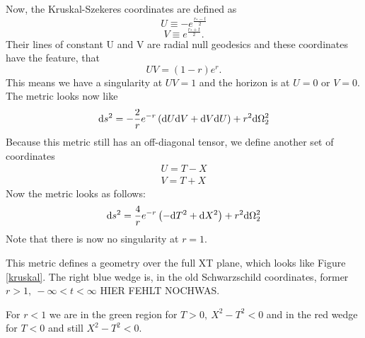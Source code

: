 		Now, the Kruskal-Szekeres coordinates are defined as
		\begin{equation}
			U\equiv -e^{\frac{r_*-t}{2}}
		\end{equation}
		\begin{equation}
			V\equiv e^{\frac{r_*+t}{2}}.
		\end{equation}
	Their lines of constant U and V are radial null geodesics and these coordinates have the feature, that
		\begin{equation}
			 UV=(1-r)e^r.
		\end{equation}
	This means we have a singularity at $UV=1$ and the horizon is at $U=0$ or $V=0$. The metric looks now like
		\begin{equation}
			\mathrm{d} s^2=-\frac{2}{r}e^{-r}\left(\mathrm{d} U \mathrm{d} V + \mathrm{d} V \mathrm{d} U\right)+r^2 \mathrm{d} \Omega^2_{2}
		\end{equation}
	Because this metric still has an off-diagonal tensor, we define another set of coordinates
		\begin{equation}
		\begin{split}
			U=T-X 	\\	
			V=T+X
		\end{split}
		\end{equation}
	Now the metric looks as follows:
		\begin{equation}\label{SchXT}
			\mathrm{d} s^2=\frac{4}{r}e^{-r}\left(- \mathrm{d} T^2+ \mathrm{d} X^2\right)+r^2 \mathrm{d} \Omega^2_2
		\end{equation}
	Note that there is now no singularity at $r=1$.
	
	This metric defines a geometry over the full XT plane, which looks like Figure \ref{kruskal}. The right blue wedge is, in the old Schwarzschild coordinates, former $r>1,~-\infty<t<\infty$ HIER FEHLT NOCHWAS. 
		
		For $r<1$ we are in the green region for $T>0,~X^2-T^2<0$ and in the red wedge for $T<0$ and still $X^2-T^2<0$. 
